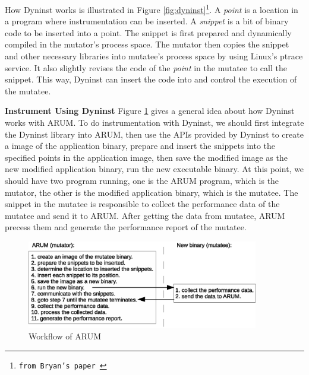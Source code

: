\documentclass[11pt,letterpaper,oneside]{article}
\begin{document}
How Dyninst works is illustrated in Figure \ref{fig:dyninst}\footnote{\texttt{from Bryan's paper \cite{bib:anapi}}}. A \emph{point} is a location in a program where instrumentation can be inserted. A \emph{snippet} is a bit of binary code to be inserted into a point. The snippet is first prepared and dynamically compiled in the mutator's process space. The mutator then copies the snippet and other necessary libraries into mutatee's process space by using Linux's ptrace service. It also slightly revises the code of the \emph{point} in the mutatee to call the snippet. This way, Dyninst can insert the code into and control the execution of the mutatee.

\noindent \newline\textbf{Instrument Using Dyninst}\newline
\indent Figure \ref{fig:workflow} gives a general idea about how Dyninst works with ARUM. To do instrumentation with Dyninst, we should first integrate the Dyninst library into ARUM, then use the APIs provided by Dyninst to create a image of the application binary, prepare and insert the snippets into the specified points in the application image, then save the modified image as the new modified application binary, run the new executable binary. At this point, we should have two program running, one is the ARUM program, which is the mutator, the other is the modified application binary, which is the mutatee. The snippet in the mutatee is responsible to collect the performance data of the mutatee and send it to ARUM. After getting the data from mutatee, ARUM precess them and generate the performance report of the mutatee.

\begin{figure}
\begin{center}
\includegraphics[width=0.9\textwidth]{workflow.eps}
\caption{Workflow of ARUM}
\label{fig:workflow}
\end{center}
\end{figure}
\end{document}
